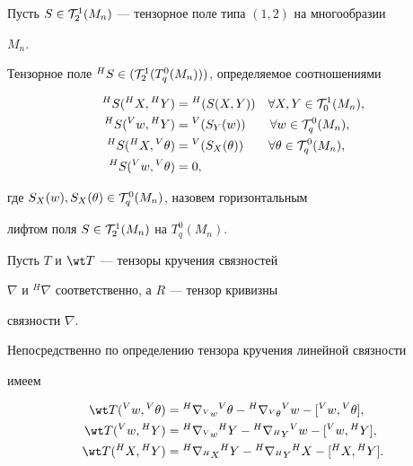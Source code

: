 Пусть $S\in{\cal T}^1_2(M_n)$ --- тензорное поле типа $(1,2)$ на многообразии


$M_n$.


Тензорное поле ${}^HS\in({\cal T}^1_2(T^0_q(M_n)))$, определяемое соотношениями


\begin{equation}


\begin{split}


{}^HS({}^HX,{}^HY)&={}^H(S(X,Y))\quad \forall X,Y\in{\cal T}^1_0(M_n), \\


{}^HS({}^Vw,{}^HY)&={}^V(S_Y(w)) \quad \ \ 


\; \forall w\in{\cal T}^0_q(M_n), \\


{}^HS({}^HX,{}^V\theta)&={}^V(S_X(\theta)) \qquad


\forall \theta\in{\cal T}^0_q(M_n), \\


{}^HS({}^Vw,{}^V\theta)&=0, 


\end{split}


\end{equation}


где $S_X(w),S_X(\theta)\in{\cal T}^0_q(M_n)$, назовем горизонтальным


лифтом поля  $S\in{\cal T}^1_2(M_n)$ на $T^0_q(M_n)$.





Пусть $T$ и $\wt T$ --- тензоры кручения связностей


$\nabla$ и ${}^H\nabla$ соответственно, а $R$ --- тензор кривизны


связности $\nabla$.


Непосредственно по определению тензора кручения линейной связности


имеем


\begin{align*}


\wt T({}^Vw,{}^V\theta)&={}^H\nabla_{{}^Vw}{}^V\theta-


{}^H\nabla_{{}^V\theta}{}^Vw-[{}^Vw,{}^V\theta], \\


\wt T({}^Vw,{}^HY)&={}^H\nabla_{{}^Vw}{}^HY-


{}^H\nabla_{{}^HY}{}^Vw-[{}^Vw,{}^HY], \\


\wt T({}^HX,{}^HY)&={}^H\nabla_{{}^HX}{}^HY-


{}^H\nabla_{{}^HY}{}^HX-[{}^HX,{}^HY].


\end{align*}


